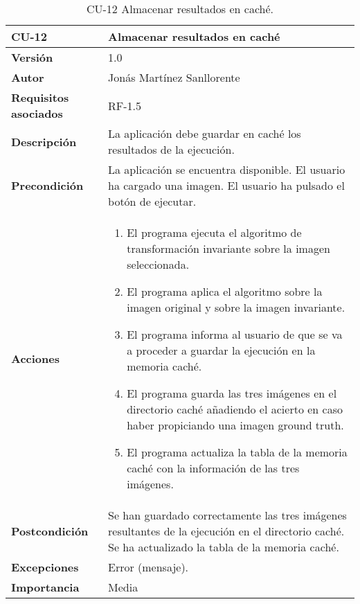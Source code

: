 \begin{table}[p]
	\centering
	\begin{tabularx}{\linewidth}{ p{} p{} }
		\toprule
		\textbf{CU-12}    & \textbf{Almacenar resultados en caché}\\
		\toprule
		\textbf{Versión}              & 1.0    \\
		\textbf{Autor}                & Jonás Martínez Sanllorente \\
		\textbf{Requisitos asociados} & RF-1.5 \\
		\textbf{Descripción}          & La aplicación debe guardar en caché los resultados de la ejecución. \\
		\textbf{Precondición}         & La aplicación se encuentra disponible.\newline
                                        El usuario ha cargado una imagen.\newline
                                        El usuario ha pulsado el botón de ejecutar.\\
		\textbf{Acciones}             &
		\begin{enumerate}
			\def\labelenumi{\arabic{enumi}.}
			\tightlist
			\item El programa ejecuta el algoritmo de transformación invariante sobre la imagen seleccionada.
			\item El programa aplica el algoritmo sobre la imagen original y sobre la imagen invariante.
            \item El programa informa al usuario de que se va a proceder a guardar la ejecución en la memoria caché.
            \item El programa guarda las tres imágenes en el directorio caché añadiendo el acierto en caso haber propiciando una imagen ground truth.
            \item El programa actualiza la tabla de la memoria caché con la información de las tres imágenes.
		\end{enumerate}\\
		\textbf{Postcondición}        & Se han guardado correctamente las tres imágenes resultantes de la ejecución en el directorio caché.\newline
                                        Se ha actualizado la tabla de la memoria caché.\\
		\textbf{Excepciones}          & Error (mensaje).\\
		\textbf{Importancia}          & Media \\
		\bottomrule
	\end{tabularx}
	\caption{CU-12 Almacenar resultados en caché.}
\end{table}

